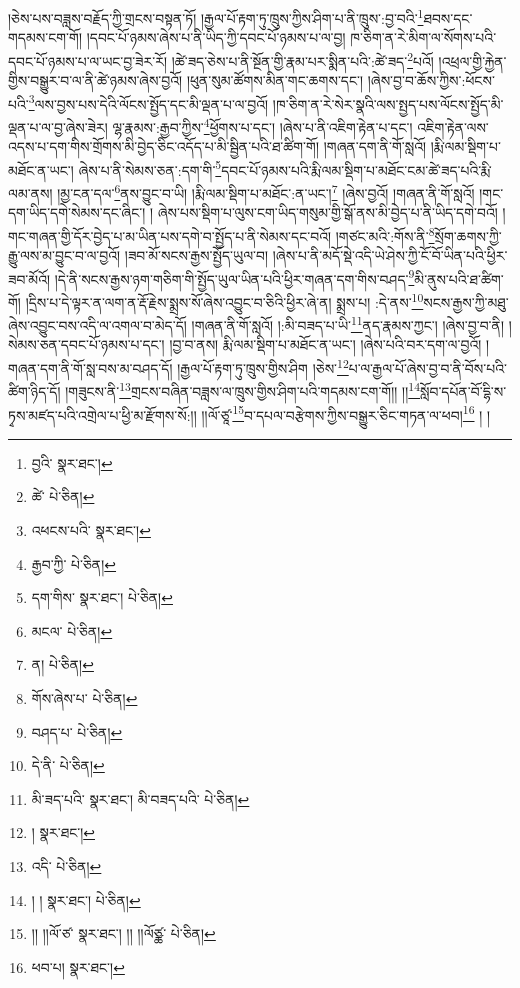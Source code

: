 །ཅེས་པས་བཟླས་བརྗོད་ཀྱི་གྲངས་བསྟན་ཏོ། །རྒྱལ་པོ་རྟག་ཏུ་ཁྲུས་ཀྱིས་ཤིག་པ་ནི་ཁྲུས་:བྱ་བའི་\footnote{བྱའི་  སྣར་ཐང་། }ཐབས་དང་གདམས་ངག་གོ། །དབང་པོ་ཉམས་ཞེས་པ་ནི་ཡིད་ཀྱི་དབང་པོ་ཉམས་པ་ལ་བྱ། ཁ་ཅིག་ན་རེ་མིག་ལ་སོགས་པའི་དབང་པོ་ཉམས་པ་ལ་ཡང་བྱ་ཟེར་རོ། །ཚེ་ཟད་ཅེས་པ་ནི་སྔོན་གྱི་རྣམ་པར་སྨིན་པའི་:ཚེ་ཟད་\footnote{ཚེ་  པེ་ཅིན། }པའོ། །འཕྲལ་གྱི་རྐྱེན་གྱིས་བསྒྱུར་བ་ལ་ནི་ཚེ་ཉམས་ཞེས་བྱའོ། །ཕུན་སུམ་ཚོགས་མིན་གང་ཆགས་དང་། །ཞེས་བྱ་བ་ཆོས་ཀྱིས་:ཕོངས་པའི་\footnote{འཕངས་པའི་  སྣར་ཐང་། }ལས་བྱས་པས་དེའི་ལོངས་སྤྱོད་དང་མི་ལྡན་པ་ལ་བྱའོ། །ཁ་ཅིག་ན་རེ་སེར་སྣའི་ལས་སྤྱད་པས་ལོངས་སྤྱོད་མི་ལྡན་པ་ལ་བྱ་ཞེས་ཟེར། ལྷ་རྣམས་:རྒྱབ་ཀྱིས་\footnote{རྒྱབ་ཀྱི་  པེ་ཅིན། }ཕྱོགས་པ་དང་། །ཞེས་པ་ནི་འཇིག་རྟེན་པ་དང་། འཇིག་རྟེན་ལས་འདས་པ་དག་གིས་གྲོགས་མི་བྱེད་ཅིང་འདོད་པ་མི་སྦྱིན་པའི་ཐ་ཚིག་གོ། །གཞན་དག་ནི་གོ་སླའོ། །རྨི་ལམ་སྡིག་པ་མཐོང་ན་ཡང་། ཞེས་པ་ནི་སེམས་ཅན་:དག་གི་\footnote{དག་གིས་  སྣར་ཐང་།  པེ་ཅིན། }དབང་པོ་ཉམས་པའི་རྨི་ལམ་སྡིག་པ་མཐོང་ངམ་ཚེ་ཟད་པའི་རྨི་ལམ་ནས། །མྱ་ངན་དལ་\footnote{མངལ་  པེ་ཅིན། }ནས་བྱུང་བ་ཡི། །རྨི་ལམ་སྡིག་པ་མཐོང་:ན་ཡང་།\footnote{ན།  པེ་ཅིན། } །ཞེས་བྱའོ། །གཞན་ནི་གོ་སླའོ། །གང་དག་ཡིད་དགེ་སེམས་དང་ཞིང་། །
ཞེས་པས་སྡིག་པ་ལུས་ངག་ཡིད་གསུམ་གྱི་སྒོ་ནས་མི་བྱེད་པ་ནི་ཡིད་དགེ་བའོ། །གང་གཞན་གྱི་དོར་བྱེད་པ་མ་ཡིན་པས་དགེ་བ་སྤྱོད་པ་ནི་སེམས་དང་བའོ། །གཙང་མའི་:གོས་ནི་\footnote{གོས་ཞེས་པ་  པེ་ཅིན། }སྲོག་ཆགས་ཀྱི་རྒྱུ་ལས་མ་བྱུང་བ་ལ་བྱའོ། །ཟབ་མོ་སངས་རྒྱས་སྤྱོད་ཡུལ་བ། །ཞེས་པ་ནི་མདོ་སྡེ་འདི་ཡེ་ཤེས་ཀྱི་ངོ་བོ་ཡིན་པའི་ཕྱིར་ཟབ་མོའོ། །དེ་ནི་སངས་རྒྱས་ཉག་གཅིག་གི་སྤྱོད་ཡུལ་ཡིན་པའི་ཕྱིར་གཞན་དག་གིས་བཤད་\footnote{བཤད་པ་  པེ་ཅིན། }མི་ནུས་པའི་ཐ་ཚིག་གོ། །དྲིས་པ་དེ་ལྟར་ན་ལག་ན་རྡོ་རྗེས་སྨྲས་སོ་ཞེས་འབྱུང་བ་ཅིའི་ཕྱིར་ཞེ་ན། སྨྲས་པ། :དེ་ནས་\footnote{དེ་ནི་  པེ་ཅིན། }སངས་རྒྱས་ཀྱི་མཐུ་ཞེས་འབྱུང་བས་འདི་ལ་འགལ་བ་མེད་དོ། །གཞན་ནི་གོ་སླའོ། །:མི་བཟད་པ་ཡི་\footnote{མི་ཟད་པའི་  སྣར་ཐང་། མི་བཟད་པའི་  པེ་ཅིན། }ནད་རྣམས་ཀྱང་། །ཞེས་བྱ་བ་ནི། །སེམས་ཅན་དབང་པོ་ཉམས་པ་དང་། །བྱ་བ་ནས། རྨི་ལམ་སྡིག་པ་མཐོང་ན་ཡང་། །ཞེས་པའི་བར་དག་ལ་བྱའོ། །གཞན་དག་ནི་གོ་སླ་བས་མ་བཤད་དོ། །རྒྱལ་པོ་རྟག་ཏུ་ཁྲུས་གྱིས་ཤིག །ཅེས་\footnote{།  སྣར་ཐང་། }པ་ལ་རྒྱལ་པོ་ཞེས་བྱ་བ་ནི་བོས་པའི་ཚིག་ཉིད་དོ། །གཟུངས་ནི་\footnote{འདི་  པེ་ཅིན། }གྲངས་བཞིན་བཟླས་ལ་ཁྲུས་གྱིས་ཤིག་པའི་གདམས་ངག་གོ།། །།\footnote{། །  སྣར་ཐང་།  པེ་ཅིན། }སློབ་དཔོན་བོ་དྷི་ས་ཏྭས་མཛད་པའི་འགྲེལ་པ་ཕྱི་མ་རྫོགས་སོ:།། །།ལོ་ཙཱ་\footnote{།། །།ལོ་ཙ་  སྣར་ཐང་། །། །།ལོཙྪ་  པེ་ཅིན། }བ་དཔལ་བརྩེགས་ཀྱིས་བསྒྱུར་ཅིང་གཏན་ལ་ཕབ།\footnote{ཕབ་པ།  སྣར་ཐང་། } ། །